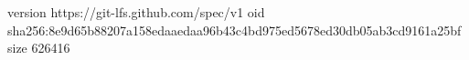 version https://git-lfs.github.com/spec/v1
oid sha256:8e9d65b88207a158edaaedaa96b43c4bd975ed5678ed30db05ab3cd9161a25bf
size 626416
